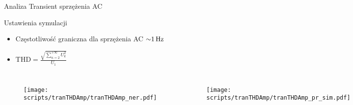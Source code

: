 \begin{frame}{Analiza Transient sprzężenia AC}
    \vspace{-1em}
    \begin{block}{Ustawienia symulacji}
\begin{itemize}
    \item Częstotliwość graniczna dla sprzężenia AC $\SI{\sim 1}{\hertz}$
    \item $\mathrm{THD} = \frac{\sqrt{\sum_{n=2}^{+\infty} U_k^2}}{U_1}$
\end{itemize}
    \end{block}


    \begin{columns}
        \vspace{-1em} %

        \begin{figure}[H]
            \centering
            \texttt{[image: scripts/tranTHDAmp/tranTHDAmp\_ner.pdf]}
        \end{figure}
        \vspace{-1em} %
        \begin{figure}[H]
            \centering
            \texttt{[image: scripts/tranTHDAmp/tranTHDAmp\_pr\_sim.pdf]}
        \end{figure}
    \end{columns}

\end{frame}









